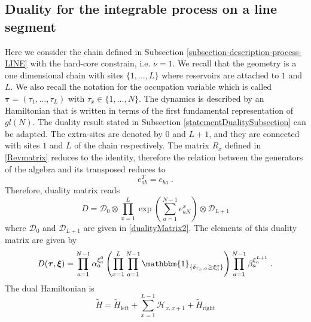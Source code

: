 \documentclass[10pt]{article}
\numberwithin{equation}{section}
\numberwithin{equation}{subsection}
\newcommand{\dt}{\;.}
\begin{document}
\subsection{Duality for the integrable process on a line segment}\label{integrableChain-duality}
Here we consider the chain defined in Subsection \ref{subsection-description-process-LINE} with the hard-core constrain, i.e. $\nu=1$. 
We recall that the geometry is a one dimensional chain with sites $\{1,\ldots,L\}$ where reservoirs are attached to $1$ and $L$. 
We also recall the notation for the occupation variable which is called $\bm{\tau}=(\tau_1,\ldots,\tau_L)$ with $\tau_x\in\{1,\ldots,N\}$.
The dynamics is described by an Hamiltonian that is written in terms of the first fundamental representation of $gl(N)$. The duality result stated in Subsection \ref{statementDualitySubsection} can be adapted. The extra-sites are denoted by $0$ and $L+1$, and they are connected with sites $1$ and $L$ of the chain respectively. The matrix $R_{x}$ defined in \eqref{Revmatrix} 
reduces to the identity, therefore the relation between the generators of the algebra and its transposed reduces to
\begin{equation}\label{transpostionPropertyFund}
	e_{ab}^T= e_{ba}\dt
\end{equation}
Therefore, duality matrix reads
\begin{equation}
	D=\mathcal{D}_{0}\otimes\prod_{x=1}^{L}\exp{\left(\sum_{a=1}^{N-1}e_{aN}^{x}\right)}\otimes \mathcal{D}_{L+1}
\end{equation}
where $\mathcal{D}_{0}$ and $\mathcal{D}_{L+1}$ are given in \eqref{dualityMatrix2}. 
The elements of this duality matrix are given by
\begin{equation}\label{ElementsDualityMatrixChain_1}
	D(\bm{\tau},\bm{\xi})=\prod_{a=1}^{N-1}\alpha_{a}^{\xi_{a}^{0}}\left(\prod_{x=1}^{L}\prod_{a=1}^{N-1}\mathbbm{1}_{\{\delta_{\tau_{x},a}\geq \xi_{a}^{x}\}}\right)\prod_{a=1}^{N-1}\beta_{a}^{\xi_{a}^{L+1}}\dt
\end{equation}
The dual Hamiltonian is
\begin{equation}
	\widetilde{H}=\widetilde{H}_{\text{left}}+\sum_{x=1}^{L-1}\mathcal{H}_{x,x+1}+\widetilde{H}_{\text{right}}
\end{equation}
\end{document}
